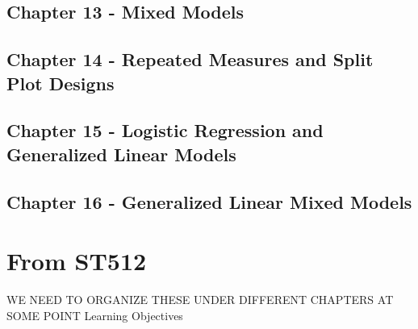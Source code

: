 \documentclass[]{book}
\begin{document}
\subsection{Chapter 13 - Mixed Models}\label{chapter-13---mixed-models}

\subsection{Chapter 14 - Repeated Measures and Split Plot
Designs}\label{chapter-14---repeated-measures-and-split-plot-designs}

\subsection{Chapter 15 - Logistic Regression and Generalized Linear
Models}\label{chapter-15---logistic-regression-and-generalized-linear-models}

\subsection{Chapter 16 - Generalized Linear Mixed
Models}\label{chapter-16---generalized-linear-mixed-models}

\section{From ST512}\label{from-st512}

WE NEED TO ORGANIZE THESE UNDER DIFFERENT CHAPTERS AT SOME POINT
Learning Objectives
\end{document}
